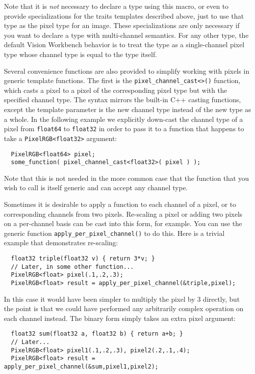 Note that it is {\it not} necessary to declare a type using this macro,
or even to provide specializations for the traits templates described
above, just to use that type as the pixel type for an image.  These
specializations are only necessary if you want to declare a type with
multi-channel semantics.  For any other type, the default Vision
Workbench behavior is to treat the type as a single-channel pixel type
whose channel type is equal to the type itself.

Several convenience functions are also provided to simplify working
with pixels in generic template functions.  The first is the
\verb#pixel_channel_cast<>()# function, which casts a pixel to a pixel
of the corresponding pixel type but with the specified channel type.
The syntax mirrors the built-in C++ casting functions, except the
template parameter is the new channel type instead of the new type as
a whole.  In the following example we explicitly down-cast the channel
type of a pixel from \verb#float64# to \verb#float32# in order to pass
it to a function that happens to take a \verb#PixelRGB<float32>#
argument:
\begin{verbatim}
  PixelRGB<float64> pixel;
  some_function( pixel_channel_cast<float32>( pixel ) );
\end{verbatim}
Note that this is not needed in the more common case that the 
function that you wish to call is itself generic and can accept 
any channel type.

Sometimes it is desirable to apply a function to each channel
of a pixel, or to corresponding channels from two pixels.  Re-scaling a
pixel or adding two pixels on a per-channel basis can be cast into
this form, for example.  You can use the generic function
\verb#apply_per_pixel_channel()# to do this.  Here is a trivial 
example that demonstrates re-scaling:
\begin{verbatim}
  float32 triple(float32 v) { return 3*v; }
  // Later, in some other function...
  PixelRGB<float> pixel(.1,.2,.3);
  PixelRGB<float> result = apply_per_pixel_channel(&triple,pixel);
\end{verbatim}
In this case it would have been simpler to multiply the pixel 
by $3$ directly, but the point is that we could have performed 
any arbitrarily complex operation on each channel instead.
The binary form simply takes an extra pixel argument:
\begin{verbatim}
  float32 sum(float32 a, float32 b) { return a+b; }
  // Later...
  PixelRGB<float> pixel1(.1,.2,.3), pixel2(.2,.1,.4);
  PixelRGB<float> result = apply_per_pixel_channel(&sum,pixel1,pixel2);
\end{verbatim}

